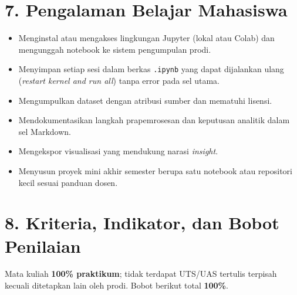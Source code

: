 \documentclass[12pt,a4paper]{article}
\begin{document}
\vspace{0.5cm}

\section*{7. Pengalaman Belajar Mahasiswa}

\begin{itemize}[leftmargin=*]
  \item Menginstal atau mengakses lingkungan Jupyter (lokal atau Colab) dan mengunggah notebook ke sistem pengumpulan prodi.
  \item Menyimpan setiap sesi dalam berkas \texttt{.ipynb} yang dapat dijalankan ulang (\textit{restart kernel and run all}) tanpa error pada sel utama.
  \item Mengumpulkan dataset dengan atribusi sumber dan mematuhi lisensi.
  \item Mendokumentasikan langkah prapemrosesan dan keputusan analitik dalam sel Markdown.
  \item Mengekspor visualisasi yang mendukung narasi \textit{insight}.
  \item Menyusun proyek mini akhir semester berupa satu notebook atau repositori kecil sesuai panduan dosen.
\end{itemize}

\vspace{0.5cm}

\section*{8. Kriteria, Indikator, dan Bobot Penilaian}

Mata kuliah \textbf{100\% praktikum}; tidak terdapat UTS/UAS tertulis terpisah kecuali ditetapkan lain oleh prodi. Bobot berikut total \textbf{100\%}.
\end{document}

